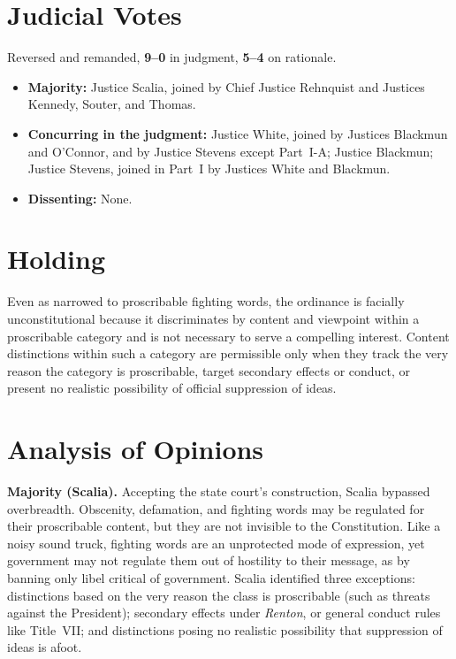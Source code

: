 \documentclass[12pt]{article}
\begin{document}
\section{Judicial Votes}

Reversed and remanded, \textbf{9--0} in judgment, \textbf{5--4} on rationale.
\begin{itemize}
\item \textbf{Majority:} Justice Scalia, joined by Chief Justice Rehnquist and Justices Kennedy, Souter, and Thomas.
\item \textbf{Concurring in the judgment:} Justice White, joined by Justices Blackmun and O'Connor, and by Justice Stevens except Part~I-A; Justice Blackmun; Justice Stevens, joined in Part~I by Justices White and Blackmun.
\item \textbf{Dissenting:} None.
\end{itemize}

\section{Holding}

Even as narrowed to proscribable fighting words, the ordinance is facially unconstitutional because it discriminates by content and viewpoint within a proscribable category and is not necessary to serve a compelling interest. Content distinctions within such a category are permissible only when they track the very reason the category is proscribable, target secondary effects or conduct, or present no realistic possibility of official suppression of ideas.

\section{Analysis of Opinions}

\textbf{Majority (Scalia).} Accepting the state court's construction, Scalia bypassed overbreadth. Obscenity, defamation, and fighting words may be regulated for their proscribable content, but they are not invisible to the Constitution. Like a noisy sound truck, fighting words are an unprotected mode of expression, yet government may not regulate them out of hostility to their message, as by banning only libel critical of government. Scalia identified three exceptions: distinctions based on the very reason the class is proscribable (such as threats against the President); secondary effects under \textit{Renton}, or general conduct rules like Title~VII; and distinctions posing no realistic possibility that suppression of ideas is afoot.
\end{document}
